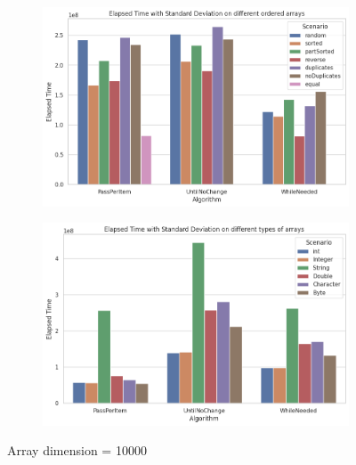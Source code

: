 \documentclass{article}
\begin{document}
\begin{figure}[H]
    \centering
    \begin{subfigure}[b]{0.4\textwidth}
        \centering
        \includegraphics[width=\textwidth]{./data/std_order_array_10000.png}
    \end{subfigure}
    \hfill
    \begin{subfigure}[b]{0.4\textwidth}
        \centering
        \includegraphics[width=\textwidth]{./data/std_type_array_10000.png}
    \end{subfigure}
    \caption{Array dimension = 10000}
\end{figure}
\end{document}
